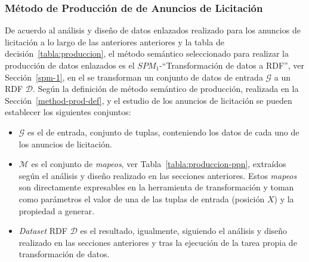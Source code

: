 \subsubsection{Método de Producción de \linkeddata de Anuncios de Licitación}
De acuerdo al análisis y diseño de datos enlazados realizado para los anuncios de licitación
a lo largo de las anteriores anteriores y la tabla de decisión~\ref{tabla:produccion}, el método semántico seleccionado 
para realizar la producción de datos enlazados es el $SPM_1$-``Transformación de datos a RDF'', ver Sección~\ref{spm-1}, en el 
se transforman un conjunto de datos de entrada $\mathcal{G}$ a un \dataset RDF $\mathcal{D}$. Según la definición de método 
semántico de producción, realizada en la Sección~\ref{method-prod-def}, y el estudio de los anuncios de licitación se pueden 
establecer los siguientes conjuntos:
\begin{itemize}
 \item $\mathcal{G}$ es el \dataset de entrada, conjunto de tuplas, conteniendo los datos de cada uno de los anuncios de licitación.
 \item $\mathcal{M}$ es el conjunto de \textit{mapeos}, ver Tabla~\ref{tabla:produccion-ppn}, extraídos según el análisis y diseño realizado en las secciones anteriores. Estos 
\textit{mapeos} son directamente expresables en la herramienta de transformación y toman como parámetros el valor de una de las tuplas de entrada (posición $X$) y la propiedad a generar.
 \item \textit{Dataset} \gls{RDF} $\mathcal{D}$ es el \dataset resultado, igualmente, siguiendo el análisis y diseño realizado en las secciones anteriores y tras la ejecución 
de la tarea propia de transformación de datos.
\end{itemize}
% 

